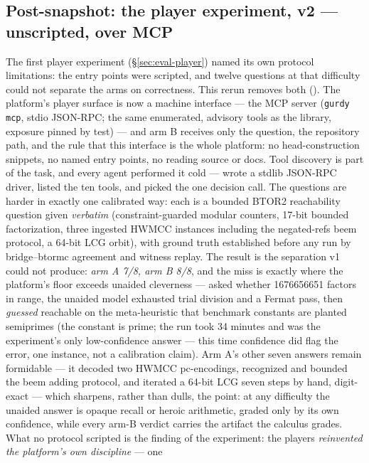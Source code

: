 \subsection{Post-snapshot: the player experiment, v2 --- unscripted, over MCP}
\label{sec:eval-player2}



The first player experiment (\S\ref{sec:eval-player}) named its own
protocol limitations: the entry points were scripted, and twelve
questions at that difficulty could not separate the arms on
correctness. This rerun removes both (). The
platform's player surface is now a machine interface --- the MCP
server (\texttt{gurdy mcp}, stdio JSON-RPC; the same enumerated,
advisory tools as the library, exposure pinned by test) --- and arm B
receives only the question, the repository path, and the rule that
this interface is the whole platform: no head-construction snippets,
no named entry points, no reading source or docs. Tool discovery is
part of the task, and every agent performed it cold --- wrote a
stdlib JSON-RPC driver, listed the ten tools, and picked the one
decision call. The questions are harder in exactly one calibrated
way: each is a bounded BTOR2 reachability question given
\emph{verbatim} (constraint-guarded modular counters, 17-bit bounded
factorization, three ingested HWMCC instances including the
negated-refs beem protocol, a 64-bit LCG orbit), with ground truth
established before any run by bridge--btormc agreement and witness
replay. The result is the separation v1 could not produce: \emph{arm
A 7/8, arm B 8/8}, and the miss is exactly where the platform's
floor exceeds unaided cleverness --- asked whether 1676656651
factors in range, the unaided model exhausted trial division and a
Fermat pass, then \emph{guessed} reachable on the meta-heuristic
that benchmark constants are planted semiprimes (the constant is
prime; the run took 34 minutes and was the experiment's only
low-confidence answer --- this time confidence did flag the error,
one instance, not a calibration claim). Arm A's other seven answers
remain formidable --- it decoded two HWMCC pc-encodings, recognized
and bounded the beem adding protocol, and iterated a 64-bit LCG
seven steps by hand, digit-exact --- which sharpens, rather than
dulls, the point: at any difficulty the unaided answer is opaque
recall or heroic arithmetic, graded only by its own confidence,
while every arm-B verdict carries the artifact the calculus grades.
What no protocol scripted is the finding of the experiment: the
players \emph{reinvented the platform's own discipline} --- one
